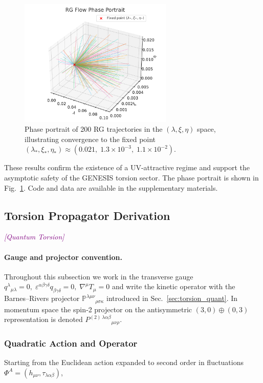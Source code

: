 \documentclass{article}
\newcommand{\quantumtag}{\textcolor{purple}{\textit{[Quantum Torsion]}}}
\begin{document}
\begin{figure}[h!]
\centering
\includegraphics[width=0.65\textwidth]{RGflow_phase_portrait}
\caption{Phase portrait of 200 RG trajectories in the $(\lambda, \xi, \eta)$ space, illustrating convergence to the fixed point $(\lambda_*, \xi_*, \eta_*) \approx (0.021,\; 1.3 \times 10^{-3},\; 1.1 \times 10^{-2})$.}
\label{fig:rg_phase_flow}
\end{figure}


These results confirm the existence of a UV-attractive regime and support the asymptotic safety of the GENESIS torsion sector. The phase portrait is shown in Fig.~\ref{fig:rg_phase_flow}. Code and data are available in the supplementary materials.





\subsection{Torsion Propagator Derivation}
\label{subsec:torsion_propagator}
\quantumtag


\paragraph{Gauge and projector convention.}
Throughout this subsection we work in the transverse gauge
$q^{\lambda}{}_{\mu\lambda}=0,\;
 \varepsilon^{\alpha\beta\gamma\delta}q_{\beta\gamma\delta}=0,\;
 \nabla^{\mu}T_\mu=0$
and write the kinetic operator with the Barnes–Rivers projector
$\mathbb{P}^{\lambda\mu\nu}{}_{\rho\sigma\kappa}$ introduced in
Sec.~\ref{sec:torsion_quant}.  In momentum space the spin‑2 projector on the
antisymmetric \((3,0)\oplus(0,3)\) representation is denoted
$P^{(2)\,\lambda\alpha\beta}{}_{\mu\nu\rho}$.

\subsubsection{Quadratic Action and Operator}
Starting from the Euclidean action expanded to second order in fluctuations
\(\Phi^A=(h_{\mu\nu},\tau_{\lambda\alpha\beta})\),
\end{document}
